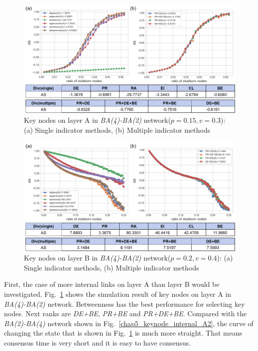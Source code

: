 \begin{figure}[!htb]
	\centering
	\includegraphics[width=\hsize]{figure/chap5_keynode_internal_A.png}
	\caption{Key nodes on layer A in \textit{BA(4)-BA(2)} network($p=0.15, v=0.3$):
		(a) Single indicator methods, (b) Multiple indicator methods}
	\label{chap5_keynode_internal_A}
\end{figure}
\begin{figure}[!htb]
	\centering
	\includegraphics[width=\hsize]{figure/chap5_keynode_internal_B.png}
	\caption{Key nodes on layer B in \textit{BA(4)-BA(2)} network($p=0.2, v=0.4$):
		(a) Single indicator methods, (b) Multiple indicator methods}
	\label{chap5_keynode_internal_B}
\end{figure}

First, the case of more internal links on layer A than layer B would be investigated. Fig.~\ref{chap5_keynode_internal_A} shows the simulation result of key nodes on layer A in \textit{BA(4)-BA(2)} network. Betweenness has the best performance for selecting key nodes. Next ranks are \textit{DE+BE}, \textit{PR+BE} and \textit{PR+DE+BE}. Compared with the \textit{BA(2)-BA(4)} network shown in Fig.~\ref{chap5_keynode_internal_A2}, the curve of changing the state that is shown in Fig.~\ref{chap5_keynode_internal_A} is much more straight. That means consensus time is very short and it is easy to have consensus.

